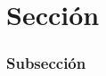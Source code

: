 \documentclass[../main.tex]{subfiles}
\begin{document}
\section{Sección}

\subsubsection{Subsección}
\end{document}
